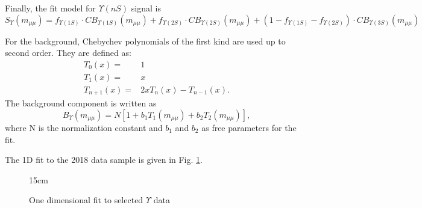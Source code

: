 Finally, the fit model for $\Upsilon(nS)$ signal is
\begin{equation} \label{eq:upsilon_sig}
  S_{\Upsilon}(m_{\mu\mu}) = f_{\Upsilon(1S)}\cdot CB_{\Upsilon(1S)} (m_{\mu\mu}) + f_{\Upsilon(2S)}\cdot CB_{\Upsilon(2S)} (m_{\mu\mu}) + (1-f_{\Upsilon(1S)}-f_{\Upsilon(2S)}) \cdot CB_{\Upsilon(3S)} (m_{\mu\mu})
\end{equation}

For the background, Chebychev polynomials of the first kind are used up to second order. They are defined as:
\begin{equation} \label{eq:upsilon_bkg}
  \begin{split}
    T_0(x) = & 1 \\
    T_1(x) = & x \\
    T_{n+1}(x) = & 2xT_n(x) - T_{n-1}(x).
  \end{split}
\end{equation}
The background component is written as
\begin{equation}
  B_{\Upsilon}(m_{\mu\mu}) = N[1 + b_1 T_1(m_{\mu\mu}) + b_2 T_2(m_{\mu\mu})],
\end{equation}
where N is the normalization constant and $b_1$ and $b_2$ as free parameters for the fit.

The 1D fit to the 2018 data sample is given in Fig. \ref{fig:fit1D_upsilon}.

\begin{figure}[!htm]{15cm}
  \caption{One dimensional fit to selected $\Upsilon$ data}%
  \label{fig:fit1D_upsilon}
\end{figure}

